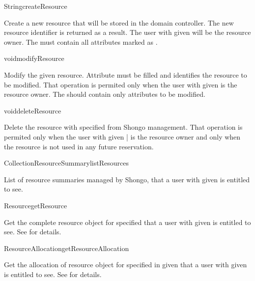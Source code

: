 \begin{Api}

\begin{ApiCmd}{String}{createResource}%
%
%
\end{ApiCmd}
Create a new resource that will be stored in the domain controller. The new resource identifier is returned as a result. The user with given  will be the resource owner. The  must contain all attributes marked as \ApiRequired.

\begin{ApiCmd}{void}{modifyResource}%
%
%
\end{ApiCmd}
Modify the given resource. Attribute  must be filled and identifies the resource to be modified. That operation is permited only when the user with given  is the resource owner. The  should contain only attributes to be modified.

\begin{ApiCmd}{void}{deleteResource}%
%
%
\end{ApiCmd}
Delete the resource with specified  from Shongo management. That operation is permited only when the user with given | is the resource owner and only when the resource is not used in any future reservation.

\begin{ApiCmdCollection}{Collection}{ResourceSummary}{listResources}%
%
\end{ApiCmdCollection}
List of resource summaries managed by Shongo, that a user with given  is entitled to see.

\begin{ApiCmd}{Resource}{getResource}%
%
%
\end{ApiCmd}
Get the complete resource object for specified  that a user with given  is entitled to see. See  for details.

\begin{ApiCmd}{ResourceAllocation}{getResourceAllocation}%
%
%
%
\end{ApiCmd}
Get the allocation of resource object for specified  in given  that a user with given  is entitled to see. See  for details.

\end{Api}



